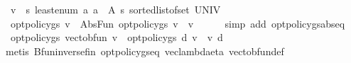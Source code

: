 \begin{isabellebody}
\ \ {\isacharparenleft}{\kern0pt}v{\isacharcomma}{\kern0pt}\ {\isacharparenleft}{\kern0pt}{\isasymchi}\ s{\isachardot}{\kern0pt}\ {\isacharparenleft}{\kern0pt}least{\isacharunderscore}{\kern0pt}enum\ {\isacharparenleft}{\kern0pt}{\isasymlambda}a{\isachardot}{\kern0pt}\ a\ {\isasymin}\ A\ s{\isacharparenright}{\kern0pt}{\isacharparenright}{\kern0pt}{\isacharparenright}{\kern0pt}{\isacharparenright}{\kern0pt}\ {\isacharparenleft}{\kern0pt}sorted{\isacharunderscore}{\kern0pt}list{\isacharunderscore}{\kern0pt}of{\isacharunderscore}{\kern0pt}set\ UNIV{\isacharparenright}{\kern0pt}{\isacharparenright}{\kern0pt}{\isacharparenright}{\kern0pt}{\isacharparenright}{\kern0pt}{\isachardoublequoteclose}\isanewline
%
\isadelimproof
%
\endisadelimproof
%
\isatagproof
{}\isamarkupfalse%
\ {\isacharminus}{\kern0pt}\isanewline
\ \ \isamarkupfalse%
\ {}{\isacharcolon}{\kern0pt}\ {\isachardoublequoteopen}opt{\isacharunderscore}{\kern0pt}policy{\isacharunderscore}{\kern0pt}gs{\isacharprime}{\kern0pt}{\isacharprime}{\kern0pt}\ v{\isacharprime}{\kern0pt}\ {\isacharequal}{\kern0pt}\ Abs{\isacharunderscore}{\kern0pt}Fun\ {\isacharparenleft}{\kern0pt}opt{\isacharunderscore}{\kern0pt}policy{\isacharunderscore}{\kern0pt}gs\ v{\isacharprime}{\kern0pt}{\isacharparenright}{\kern0pt}{\isachardoublequoteclose}\ \ v{\isacharprime}{\kern0pt}\isanewline
\ \ \ \ \isamarkupfalse%
\ {\isacharparenleft}{\kern0pt}simp\ add{\isacharcolon}{\kern0pt}\ opt{\isacharunderscore}{\kern0pt}policy{\isacharunderscore}{\kern0pt}gs{\isacharprime}{\kern0pt}{\isacharprime}{\kern0pt}{\isachardot}{\kern0pt}abs{\isacharunderscore}{\kern0pt}eq{\isacharparenright}{\kern0pt}\isanewline
\ \ \isamarkupfalse%
\ {}{\isacharcolon}{\kern0pt}\ {\isachardoublequoteopen}opt{\isacharunderscore}{\kern0pt}policy{\isacharunderscore}{\kern0pt}gs\ {\isacharparenleft}{\kern0pt}vec{\isacharunderscore}{\kern0pt}to{\isacharunderscore}{\kern0pt}bfun\ v{\isacharparenright}{\kern0pt}\ {\isacharequal}{\kern0pt}\ opt{\isacharunderscore}{\kern0pt}policy{\isacharunderscore}{\kern0pt}gs{\isacharprime}{\kern0pt}\ d\ v{\isachardoublequoteclose}\ \ v\ d\isanewline
\ \ \ \ \isamarkupfalse%
\ {\isacharparenleft}{\kern0pt}metis\ Bfun{\isacharunderscore}{\kern0pt}inverse{\isacharunderscore}{\kern0pt}fin\ opt{\isacharunderscore}{\kern0pt}policy{\isacharunderscore}{\kern0pt}gs{\isacharunderscore}{\kern0pt}eq{\isacharprime}{\kern0pt}\ vec{\isacharunderscore}{\kern0pt}lambda{\isacharunderscore}{\kern0pt}eta\ vec{\isacharunderscore}{\kern0pt}to{\isacharunderscore}{\kern0pt}bfun{\isacharunderscore}{\kern0pt}def{\isacharparenright}{\kern0pt}\isanewline

\end{isabellebody}
